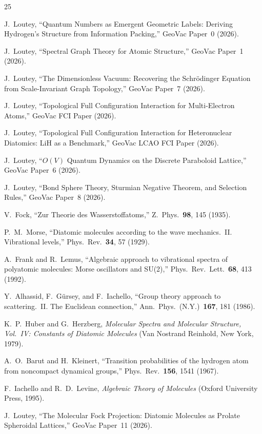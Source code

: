 \documentclass[aps,pra,twocolumn,superscriptaddress,longbibliography]{revtex4-2}
\begin{document}
\begin{thebibliography}{25}

J.~Loutey, ``Quantum Numbers as Emergent Geometric Labels: Deriving
Hydrogen's Structure from Information Packing,'' GeoVac Paper~0 (2026).

J.~Loutey, ``Spectral Graph Theory for Atomic Structure,'' GeoVac
Paper~1 (2026).

J.~Loutey, ``The Dimensionless Vacuum: Recovering the Schr\"odinger
Equation from Scale-Invariant Graph Topology,'' GeoVac Paper~7 (2026).

J.~Loutey, ``Topological Full Configuration Interaction for
Multi-Electron Atoms,'' GeoVac FCI Paper (2026).

J.~Loutey, ``Topological Full Configuration Interaction for
Heteronuclear Diatomics: LiH as a Benchmark,'' GeoVac LCAO FCI Paper
(2026).

J.~Loutey, ``$O(V)$ Quantum Dynamics on the Discrete Paraboloid
Lattice,'' GeoVac Paper~6 (2026).

J.~Loutey, ``Bond Sphere Theory, Sturmian Negative Theorem, and
Selection Rules,'' GeoVac Paper~8 (2026).

V.~Fock, ``Zur Theorie des Wasserstoffatoms,'' Z.~Phys.\ \textbf{98},
145 (1935).

P.~M.~Morse, ``Diatomic molecules according to the wave mechanics.~II.
Vibrational levels,'' Phys.\ Rev.\ \textbf{34}, 57 (1929).

A.~Frank and R.~Lemus, ``Algebraic approach to vibrational spectra of
polyatomic molecules: Morse oscillators and SU(2),'' Phys.\ Rev.\
Lett.\ \textbf{68}, 413 (1992).

Y.~Alhassid, F.~G\"ursey, and F.~Iachello, ``Group theory approach to
scattering.~II. The Euclidean connection,'' Ann.\ Phys.\ (N.Y.)\
\textbf{167}, 181 (1986).

K.~P.~Huber and G.~Herzberg, \emph{Molecular Spectra and Molecular
Structure, Vol.~IV: Constants of Diatomic Molecules} (Van Nostrand
Reinhold, New York, 1979).

A.~O.~Barut and H.~Kleinert, ``Transition probabilities of the
hydrogen atom from noncompact dynamical groups,'' Phys.\ Rev.\
\textbf{156}, 1541 (1967).

\bibitem{iachello_levine}
F.~Iachello and R.~D.~Levine, \emph{Algebraic Theory of Molecules}
(Oxford University Press, 1995).

\bibitem{loutey_paper11}
J.~Loutey,
``The Molecular Fock Projection: Diatomic Molecules as Prolate
Spheroidal Lattices,''
GeoVac Paper~11 (2026).

\end{thebibliography}
\end{document}
